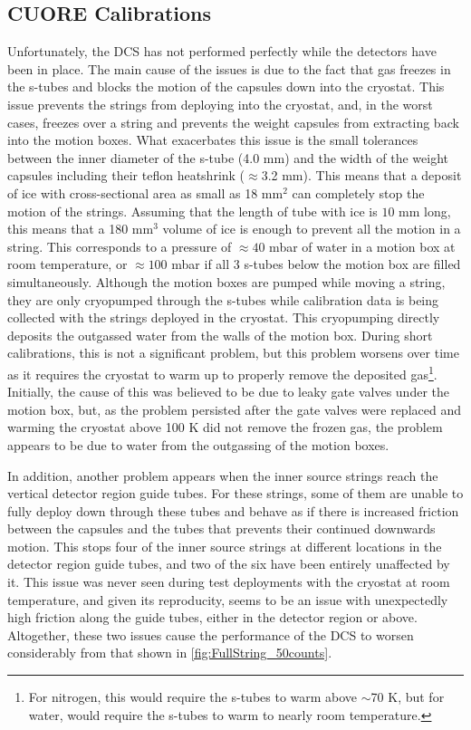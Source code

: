 \subsection*{CUORE Calibrations}
\label{ssec:CUORE Calibrations}
Unfortunately, the DCS has not performed perfectly while the detectors have been in place.
The main cause of the issues is due to the fact that gas freezes in the s-tubes and blocks the motion of the capsules down into the cryostat.
This issue prevents the strings from deploying into the cryostat, and, in the worst cases, freezes over a string and prevents the weight capsules from extracting back into the motion boxes.
What exacerbates this issue is the small tolerances between the inner diameter of the s-tube (4.0 mm) and the width of the weight capsules including their teflon heatshrink ($\approx$3.2 mm).
This means that a deposit of ice with cross-sectional area as small as 18 mm$^2$ can completely stop the motion of the strings.
Assuming that the length of tube with ice is $10$ mm long, this means that a 180 mm$^3$ volume of ice is enough to prevent all the motion in a string.
This corresponds to a pressure of $\approx40$ mbar of water in a motion box at room temperature, or $\approx100$ mbar if all 3 s-tubes below the motion box are filled simultaneously.
Although the motion boxes are pumped while moving a string, they are only cryopumped through the s-tubes while calibration data is being collected with the strings deployed in the cryostat.
This cryopumping directly deposits the outgassed water from the walls of the motion box.
During short calibrations, this is not a significant problem, but this problem worsens over time as it requires the cryostat to warm up to properly remove the deposited gas\footnote{For nitrogen, this would require the s-tubes to warm above $\sim$70 K, but for water, would require the s-tubes to warm to nearly room temperature.}.
Initially, the cause of this was believed to be due to leaky gate valves under the motion box, but, as the problem persisted after the gate valves were replaced and warming the cryostat above 100 K did not remove the frozen gas, the problem appears to be due to water from the outgassing of the motion boxes.

In addition, another problem appears when the inner source strings reach the vertical detector region guide tubes.
For these strings, some of them are unable to fully deploy down through these tubes and behave as if there is increased friction between the capsules and the tubes that prevents their continued downwards motion.
This stops four of the inner source strings at different locations in the detector region guide tubes, and two of the six have been entirely unaffected by it.
This issue was never seen during test deployments with the cryostat at room temperature, and given its reproducity, seems to be an issue with unexpectedly high friction along the guide tubes, either in the detector region or above.
Altogether, these two issues cause the performance of the DCS to worsen considerably from that shown in \autoref{fig:FullString_50counts}.

